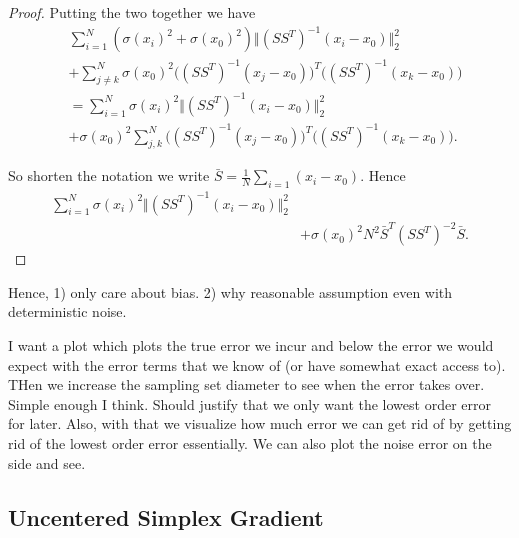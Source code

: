 \begin{proof}
Putting the two together we have
\begin{align}
    &\sum_{i = 1}^N (\sigma(x_i)^2 + \sigma(x_0)^2) \Vert (SS^T)^{-1} (x_i - x_0) \Vert_2^2 \\
    &+ \sum_{j \neq k}^N \sigma(x_0)^2 \Big( (SS^T)^{-1} (x_j - x_0) \Big)^T \Big((SS^T)^{-1} (x_k - x_0) \Big) \\
    &= \sum_{i = 1}^N \sigma(x_i)^2 \Vert (SS^T)^{-1} (x_i - x_0) \Vert_2^2 \\
    &+ \sigma(x_0)^2 \sum_{j, k}^N \Big( (SS^T)^{-1} (x_j - x_0) \Big)^T \Big((SS^T)^{-1} (x_k - x_0) \Big).
\end{align}

So shorten the notation we write $\bar{S} = \frac{1}{N} \sum_{i = 1} (x_i - x_0)$. Hence
\begin{align}
\sum_{i = 1}^N \sigma(x_i)^2 \Vert (SS^T)^{-1} (x_i - x_0) \Vert_2^2 \\
    &+ \sigma(x_0)^2 N^2 \bar{S}^T (SS^T)^{-2} \bar{S} .
\end{align}






\end{proof}

Hence, 1) only care about bias. 2) why reasonable assumption even with deterministic noise. 

I want a plot which plots the true error we incur and below the error we would expect with the error terms that we know of (or have somewhat exact access to). THen we increase the sampling set diameter to see when the error takes over. Simple enough I think. Should justify that we only want the lowest order error for later. Also, with that we visualize how much error we can get rid of by getting rid of the lowest order error essentially. We can also plot the noise error on the side and see.   


\subsection{Uncentered Simplex Gradient}


